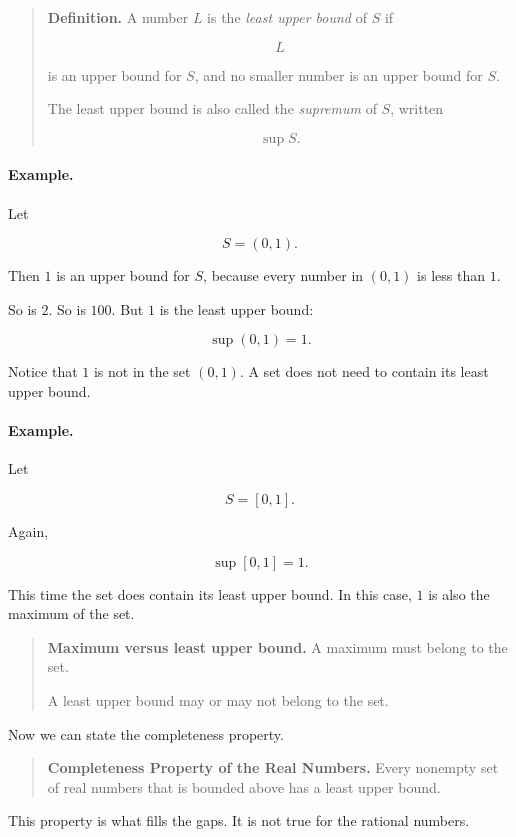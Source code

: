 \begin{quote}
\textbf{Definition.}
A number \(L\) is the \emph{least upper bound} of \(S\) if

\[
L
\]

is an upper bound for \(S\), and no smaller number is an upper bound for \(S\).

The least upper bound is also called the \emph{supremum} of \(S\), written

\[
\sup S.
\]
\end{quote}

\paragraph{Example.}
Let

\[
S=(0,1).
\]

Then \(1\) is an upper bound for \(S\), because every number in \((0,1)\) is less than \(1\).

So is \(2\). So is \(100\). But \(1\) is the least upper bound:

\[
\sup(0,1)=1.
\]

Notice that \(1\) is not in the set \((0,1)\). A set does not need to contain its least upper bound.

\paragraph{Example.}
Let

\[
S=[0,1].
\]

Again,

\[
\sup[0,1]=1.
\]

This time the set does contain its least upper bound. In this case, \(1\) is also the maximum of the set.

\begin{quote}
\textbf{Maximum versus least upper bound.}
A maximum must belong to the set.

A least upper bound may or may not belong to the set.
\end{quote}

Now we can state the completeness property.

\begin{quote}
\textbf{Completeness Property of the Real Numbers.}
Every nonempty set of real numbers that is bounded above has a least upper bound.
\end{quote}

This property is what fills the gaps. It is not true for the rational numbers.

